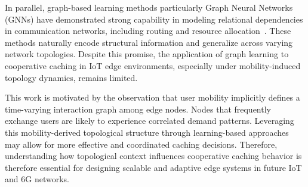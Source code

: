 In parallel, graph-based learning methods particularly Graph Neural Networks (GNNs) have demonstrated strong capability in modeling relational dependencies in communication networks, including routing and resource allocation~\cite{Rusek2019,Jiang2022Survey}. These methods naturally encode structural information and generalize across varying network topologies. Despite this promise, the application of graph learning to cooperative caching in IoT edge environments, especially under mobility-induced topology dynamics, remains limited.

This work is motivated by the observation that user mobility implicitly defines a time-varying interaction graph among edge nodes. Nodes that frequently exchange users are likely to experience correlated demand patterns. Leveraging this mobility-derived topological structure through learning-based approaches may allow for more effective and coordinated caching decisions. Therefore, understanding how topological context influences cooperative caching behavior is therefore essential for designing scalable and adaptive edge systems in future IoT and 6G networks.